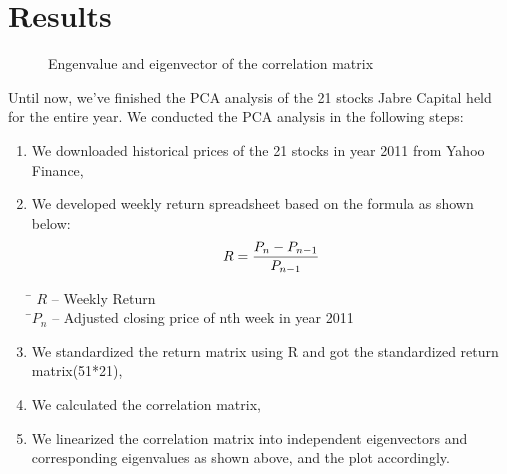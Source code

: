 \documentclass[oneside,12pt]{report}
\begin{document}
\chapter{Results}\label{Results}
\begin{figure}[ht]
\centering
{}
\caption[Optional caption for list of figures]{Engenvalue and eigenvector of the correlation matrix}
\label{fig:subfigureExample}
\end{figure}
Until now, we've finished the PCA analysis of the 21 stocks Jabre Capital held for the entire year. We conducted the PCA analysis in the following steps:
\begin{enumerate}
\item We downloaded historical prices of the 21 stocks in year 2011 from Yahoo Finance, 
\item We developed weekly return spreadsheet based on the formula as shown below:
\begin{equation}
R =\frac{P_n-P_{n-1}}{P_{n-1}}\\
\end{equation}
\begin{tabbing}
\quad \= $R$ -- Weekly Return\\
\quad \=$P_n$  -- Adjusted closing price of nth week in year 2011\\
\end{tabbing}
\item We standardized the return matrix using R and got the standardized return matrix(51*21),
\item We calculated the correlation matrix,
\item We linearized the correlation matrix into independent eigenvectors and corresponding eigenvalues as shown above, and the plot accordingly.
\end{enumerate}
\end{document}
